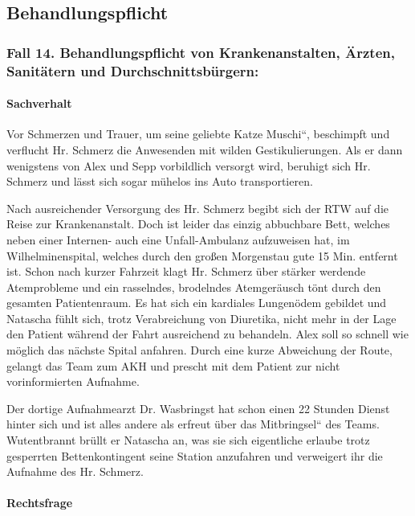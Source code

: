 \subsection{Behandlungspflicht}

\subsubsection{Fall 14. Behandlungspflicht von Krankenanstalten, \"Arzten,
Sanitätern und Durchschnittsb\"urgern:}

\paragraph*{Sachverhalt}

Vor Schmerzen und Trauer, um seine geliebte Katze
{\quotedblbase}Muschi{\textquotedblleft}, beschimpft und verflucht Hr.
Schmerz die Anwesenden mit wilden Gestikulierungen. Als er dann
wenigstens von Alex und Sepp vorbildlich versorgt wird, beruhigt sich
Hr. Schmerz und lässt sich sogar m\"uhelos ins Auto transportieren. 

Nach ausreichender Versorgung des Hr. Schmerz begibt sich der
RTW auf die Reise zur Krankenanstalt. Doch ist leider das
einzig abbuchbare Bett, welches neben einer Internen- auch
eine Unfall-Ambulanz aufzuweisen hat, im Wilhelminenspital,
welches durch den gro{\ss}en Morgenstau gute 15 Min. entfernt
ist. Schon nach kurzer Fahrzeit klagt Hr. Schmerz \"uber
stärker werdende Atemprobleme und ein rasselndes, brodelndes
Atemgeräusch t\"ont durch den gesamten Patientenraum. Es hat
sich ein kardiales Lungen\"odem gebildet und Natascha f\"uhlt
sich, trotz Verabreichung von Diuretika, nicht mehr in der
Lage den Patient während der Fahrt ausreichend zu behandeln.
Alex soll so schnell wie m\"oglich das nächste Spital
anfahren. Durch eine kurze Abweichung der Route, gelangt das
Team zum AKH und prescht mit dem Patient zur nicht
vorinformierten Aufnahme.

Der dortige Aufnahmearzt Dr. Wasbringst hat schon einen 22 Stunden
Dienst hinter sich und ist alles andere als erfreut \"uber das
{\quotedblbase}Mitbringsel{\textquotedblleft} des Teams. Wutentbrannt
br\"ullt er Natascha an, was sie sich eigentliche erlaube trotz
gesperrten Bettenkontingent seine Station anzufahren und verweigert ihr
die Aufnahme des Hr. Schmerz.

\paragraph*{Rechtsfrage}

